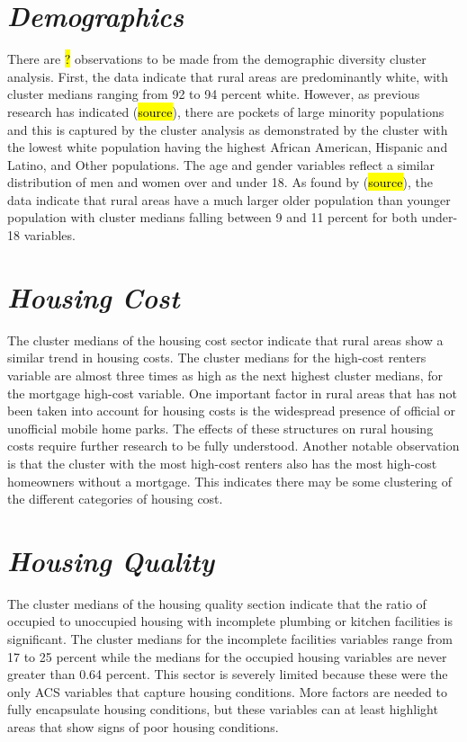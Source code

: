 \section{\textit{Demographics}}
There are \hl{?} observations to be made from the demographic diversity cluster analysis. First, the data indicate that rural areas are predominantly white, with cluster medians ranging from 92 to 94 percent white. However, as previous research has indicated (\hl{source}), there are pockets of large minority populations and this is captured by the cluster analysis as demonstrated by the cluster with the lowest white population having the highest African American, Hispanic and Latino, and Other populations. The age and gender variables reflect a similar distribution of men and women over and under 18. As found by (\hl{source}), the data indicate that rural areas have a much larger older population than younger population with cluster medians falling between 9 and 11 percent for both under-18 variables. 


\section{\textit{Housing Cost}}
The cluster medians of the housing cost sector indicate that rural areas show a similar trend in housing costs. The cluster medians for the high-cost renters variable are almost three times as high as the next highest cluster medians, for the mortgage high-cost variable. One important factor in rural areas that has not been taken into account for housing costs is the widespread presence of official or unofficial mobile home parks. The effects of these structures on rural housing costs require further research to be fully understood. Another notable observation is that the cluster with the most high-cost renters also has the most high-cost homeowners without a mortgage. This indicates there may be some clustering of the different categories of housing cost.


\section{\textit{Housing Quality}}

The cluster medians of the housing quality section indicate that the ratio of occupied to unoccupied housing with incomplete plumbing or kitchen facilities is significant. The cluster medians for the incomplete facilities variables range from 17 to 25 percent while the medians for the occupied housing variables are never greater than 0.64 percent. This sector is severely limited because these were the only ACS variables that capture housing conditions. More factors are needed to fully encapsulate housing conditions, but these variables can at least highlight areas that show signs of poor housing conditions. 


